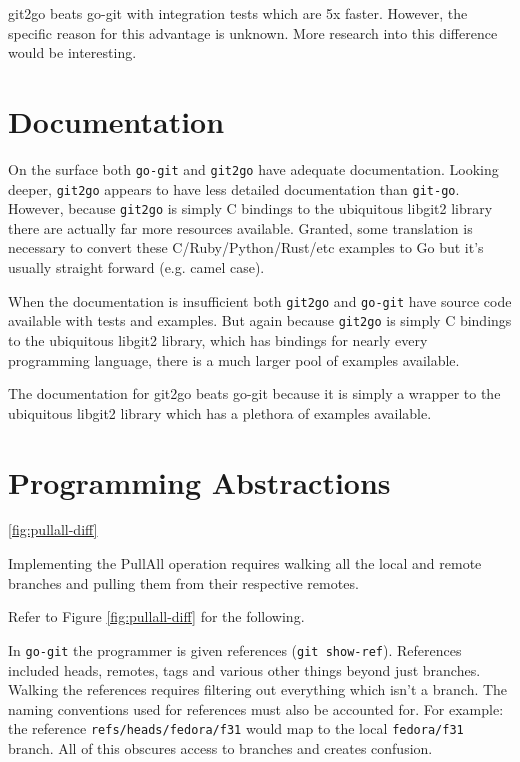 \documentclass{article}
\begin{document}
git2go beats go-git with integration tests which are 5x faster.
However, the specific reason for this advantage is unknown.
More research into this difference would be interesting.

\section{Documentation}

On the surface both \verb+go-git+ and \verb+git2go+ have adequate
documentation\autocite{go-gitdoc}\autocite{git2godoc}.
Looking deeper, \verb+git2go+ appears to have less detailed
documentation\autocite{git2godoc-clone} than
\verb+git-go+\autocite{go-gitdoc-clone}.
However, because \verb+git2go+ is simply C bindings to the ubiquitous
libgit2 library\autocite{libgit2} there are actually far more resources
available\autocite{ben.straub-clone}\autocite{libgit2101-clone}.
Granted, some translation is necessary to convert these C/Ruby/Python/Rust/etc
examples to Go but it's usually straight forward (e.g. camel case).

When the documentation is insufficient both \verb+git2go+
and \verb+go-git+ have source code available with tests and examples.
But again because \verb+git2go+ is simply C bindings to the ubiquitous
libgit2 library,
which has bindings for nearly every programming language\autocite{libgit2},
there is a much larger pool of examples available.

The documentation for git2go beats go-git because it is simply a wrapper
to the ubiquitous libgit2 library which has a plethora of examples available.

\section{Programming Abstractions}

\ref{fig:pullall-diff}

Implementing the PullAll operation requires walking all the local
and remote branches and pulling them from their respective remotes.

Refer to Figure \ref{fig:pullall-diff} for the following.

In \verb+go-git+ the programmer is given references (\verb+git show-ref+).
References included heads, remotes, tags and various other things
beyond just branches.
Walking the references requires filtering out everything which
isn't a branch.
The naming conventions used for references must also be accounted
for.
For example: the reference \verb+refs/heads/fedora/f31+ would map
to the local \verb+fedora/f31+ branch.
All of this obscures access to branches and creates confusion.
\end{document}

